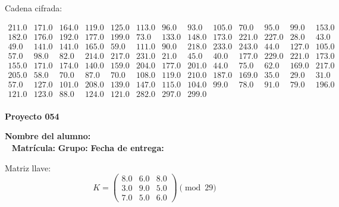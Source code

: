 \documentclass[12pt]{article}
\begin{document}
Cadena cifrada:
\begin{center}
$\begin{array}{lllllllllllll}
211.0 & 171.0 & 164.0 & 119.0 & 125.0 & 113.0 & 96.0 & 93.0 & 105.0 & 70.0 & 95.0 & 99.0 & 153.0\\
182.0 & 176.0 & 192.0 & 177.0 & 199.0 & 73.0 & 133.0 & 148.0 & 173.0 & 221.0 & 227.0 & 28.0 & 43.0\\
49.0 & 141.0 & 141.0 & 165.0 & 59.0 & 111.0 & 90.0 & 218.0 & 233.0 & 243.0 & 44.0 & 127.0 & 105.0\\
57.0 & 98.0 & 82.0 & 214.0 & 217.0 & 231.0 & 21.0 & 45.0 & 40.0 & 177.0 & 229.0 & 221.0 & 173.0\\
155.0 & 171.0 & 174.0 & 140.0 & 159.0 & 204.0 & 177.0 & 201.0 & 44.0 & 75.0 & 62.0 & 169.0 & 217.0\\
205.0 & 58.0 & 70.0 & 87.0 & 70.0 & 108.0 & 119.0 & 210.0 & 187.0 & 169.0 & 35.0 & 29.0 & 31.0\\
57.0 & 127.0 & 101.0 & 208.0 & 139.0 & 147.0 & 115.0 & 104.0 & 99.0 & 78.0 & 91.0 & 79.0 & 196.0\\
121.0 & 123.0 & 88.0 & 124.0 & 121.0 & 282.0 & 297.0 & 299.0\\
\end{array}$
\end{center}

\newpage


\textbf{Proyecto 054}

\textbf{Nombre del alumno:} \underline{\hspace{13cm}}\\\
\vspace{1cm}
\textbf{Matrícula:} \underline{\hspace{4cm}} \hspace{1cm}
\textbf{Grupo:} \underline{\hspace{2cm}}
\textbf{Fecha de entrega:} \underline{\hspace{2cm}}

\medskip

Matriz llave:
\[
K = \begin{pmatrix}
8.0 & 6.0 & 8.0\\
3.0 & 9.0 & 5.0\\
7.0 & 5.0 & 6.0
\end{pmatrix} \pmod{29}
\]
\end{document}
